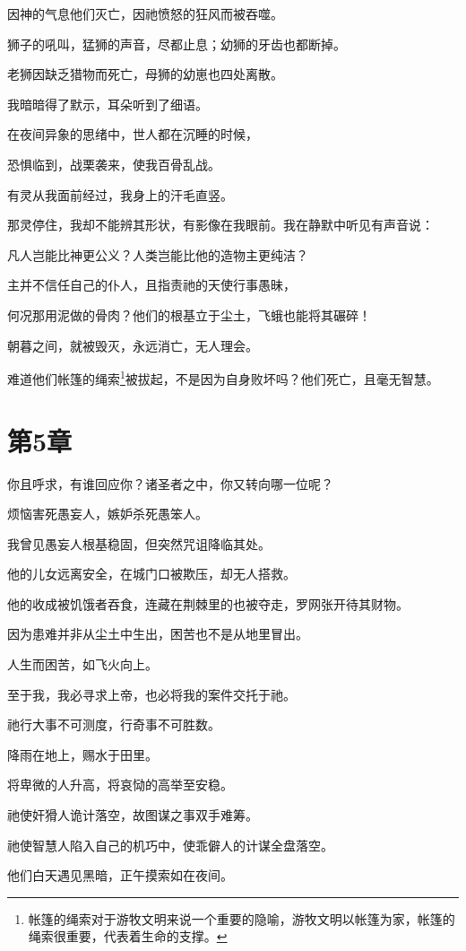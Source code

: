 \documentclass[12pt,oneside]{book}
\begin{document}
因神的气息他们灭亡，因祂愤怒的狂风而被吞噬。

狮子的吼叫，猛狮的声音，尽都止息；幼狮的牙齿也都断掉。

老狮因缺乏猎物而死亡，母狮的幼崽也四处离散。

我暗暗得了默示，耳朵听到了细语。

在夜间异象的思绪中，世人都在沉睡的时候，

恐惧临到，战栗袭来，使我百骨乱战。

有灵从我面前经过，我身上的汗毛直竖。

那灵停住，我却不能辨其形状，有影像在我眼前。我在静默中听见有声音说：

凡人岂能比神更公义？人类岂能比他的造物主更纯洁？

主并不信任自己的仆人，且指责祂的天使行事愚昧，

何况那用泥做的骨肉？他们的根基立于尘土，飞蛾也能将其碾碎！

朝暮之间，就被毁灭，永远消亡，无人理会。

难道他们帐篷的绳索\footnote{帐篷的绳索对于游牧文明来说一个重要的隐喻，游牧文明以帐篷为家，帐篷的绳索很重要，代表着生命的支撑。}被拔起，不是因为自身败坏吗？他们死亡，且毫无智慧。


\chapter{第5章}
你且呼求，有谁回应你？诸圣者之中，你又转向哪一位呢？

烦恼害死愚妄人，嫉妒杀死愚笨人。

我曾见愚妄人根基稳固，但突然咒诅降临其处。

他的儿女远离安全，在城门口被欺压，却无人搭救。

他的收成被饥饿者吞食，连藏在荆棘里的也被夺走，罗网张开待其财物。

因为患难并非从尘土中生出，困苦也不是从地里冒出。

人生而困苦，如飞火向上。

至于我，我必寻求上帝，也必将我的案件交托于祂。

祂行大事不可测度，行奇事不可胜数。

降雨在地上，赐水于田里。

将卑微的人升高，将哀恸的高举至安稳。

祂使奸猾人诡计落空，故图谋之事双手难筹。

祂使智慧人陷入自己的机巧中，使乖僻人的计谋全盘落空。

他们白天遇见黑暗，正午摸索如在夜间。
\end{document}
